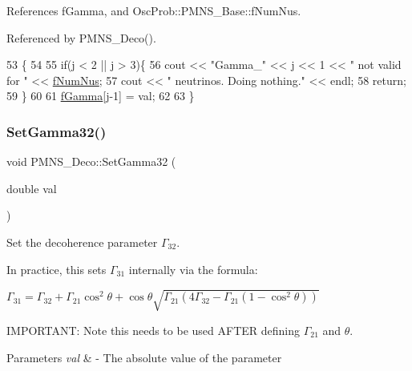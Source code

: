 References f\+Gamma, and Osc\+Prob\+::\+P\+M\+N\+S\+\_\+\+Base\+::f\+Num\+Nus.



Referenced by P\+M\+N\+S\+\_\+\+Deco().


\begin{DoxyCode}
53                                          \{
54 
55   \textcolor{keywordflow}{if}(j < 2 || j > 3)\{
56     cout << \textcolor{stringliteral}{"Gamma\_"} << j << 1 << \textcolor{stringliteral}{" not valid for "} << \hyperlink{classOscProb_1_1PMNS__Base_a24bb74bed63569dfe88b18fa6a08060e}{fNumNus};
57     cout << \textcolor{stringliteral}{" neutrinos. Doing nothing."} << endl;
58     \textcolor{keywordflow}{return};
59   \}
60 
61   \hyperlink{classOscProb_1_1PMNS__Deco_ae2f30ac9f8b25344959f1698616d337a}{fGamma}[j-1] = val;
62   
63 \}
\end{DoxyCode}
\mbox{\label{classOscProb_1_1PMNS__Deco_a1bc2d1fb1bab9841baa37eecc0135fe9}} 
\subsubsection{\texorpdfstring{Set\+Gamma32()}{SetGamma32()}}
{\footnotesize\ttfamily void P\+M\+N\+S\+\_\+\+Deco\+::\+Set\+Gamma32 (\begin{DoxyParamCaption}\item[{double}]{val }\end{DoxyParamCaption})\hspace{0.3cm}{\ttfamily [virtual]}}

Set the decoherence parameter $\Gamma_{32}$.

In practice, this sets $\Gamma_{31}$ internally via the formula\+:

$ \Gamma_{31} = \Gamma_{32} + \Gamma_{21} \cos^2\theta + \cos\theta \sqrt{\Gamma_{21} (4\Gamma_{32} - \Gamma_{21} (1 - \cos^2\theta))} $

I\+M\+P\+O\+R\+T\+A\+NT\+: Note this needs to be used A\+F\+T\+ER defining $\Gamma_{21}$ and $\theta$.


\begin{DoxyParams}{Parameters}
{\em val} & -\/ The absolute value of the parameter \\
\hline
\end{DoxyParams}


